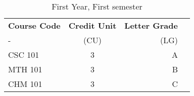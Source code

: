 \documentclass{article}
\begin{document}
	\begin{table}[h!]
		\begin{center}
			\caption{First Year, First semester}
			\label{tab:table1}
			\begin{tabular}{l|c|r|c}
				\textbf{Course Code} & \textbf{Credit Unit} &
				\textbf{Letter Grade}\\
				- & (CU) & (LG)\\
				\hline
				CSC 101 & 3 & A\\
				MTH 101 & 3 & B\\
				CHM 101 & 3 & C\\
			\end{tabular}
		\end{center}
	\end{table}
\end{document}
